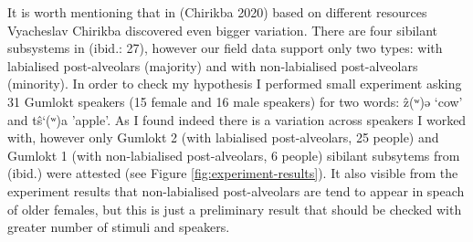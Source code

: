 \documentclass[
]{article}
\begin{document}
\begin{table}[H]

\caption{\label{tab:post_alveolar}Post-alveolar correspondences between Inzhig-Chkun and Gumlokt.}
\centering
{}
\end{table}

It is worth mentioning that in (Chirikba 2020) based on different
resources Vyacheslav Chirikba discovered even bigger variation. There
are four sibilant subsystems in (ibid.: 27), however our field data
support only two types: with labialised post-alveolars (majority) and
with non-labialised post-alveolars (minority). In order to check my
hypothesis I performed small experiment asking 31 Gumlokt speakers (15
female and 16 male speakers) for two words: ẑ(ʷ)ə `cow' and tŝ`(ʷ)a
'apple'. As I found indeed there is a variation across speakers I worked
with, however only Gumlokt 2 (with labialised post-alveolars, 25 people)
and Gumlokt 1 (with non-labialised post-alveolars, 6 people) sibilant
subsytems from (ibid.) were attested (see Figure
\ref{fig:experiment-results}). It also visible from the experiment
results that non-labialised post-alveolars are tend to appear in speach
of older females, but this is just a preliminary result that should be
checked with greater number of stimuli and speakers.
\end{document}
